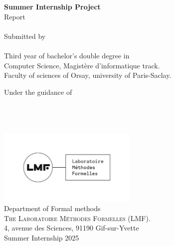 \begin{titlepage}

\begin{center}

\textup{\small {\bf Summer Internship Project} \\ Report}\\[0.3in]

\Large \textbf {}\\[0.7in]


       

\normalsize Submitted by \\[0.2in]
\\
Third year of bachelor's double degree in \\ Computer Science, Magistère d'informatique track.\\
Faculty of sciences of Orsay, university of Paris-Saclay.

\vspace{.2in}
Under the guidance of\\[0.2in]
\\
\\
\\

\vspace{.3in}

\includegraphics[width=0.5\textwidth]{lmf.png}\\[0.1in]
\Large{Department of Formal methods}\\
\normalsize
\textsc{ The Laboratoire Méthodes Formelles (LMF). }\\
4, avenue des Sciences, 91190 Gif-sur-Yvette \\
\vspace{0.2cm}
Summer Internship 2025

\end{center}

\end{titlepage}
